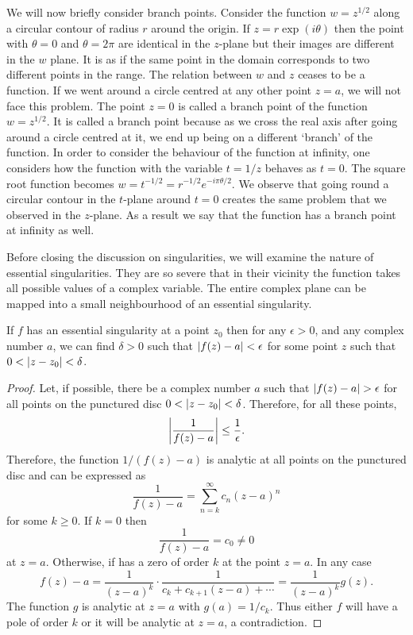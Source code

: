 We will now briefly consider branch points. Consider the function $w = z^{1/2}$
along a circular contour of radius $r$ around the origin. If $z=r\exp(i\theta)$
then the point with $\theta = 0$ and $\theta = 2\pi$ are identical in the 
$z$-plane but their images are different in the $w$ plane. It is as if the same
point in the domain corresponds to two different points in the range. The 
relation between $w$ and $z$ ceases to be a function. If we went around a circle
centred at any other point $z = a$, we will not face this problem. The point $z
= 0$ is called a branch point of the function $w = z^{1/2}$. It is called a 
branch point because as we cross the real axis after going around a circle
centred at it, we end up being on a different `branch' of the function. In order
to consider the behaviour of the function at infinity, one considers
how the function with the variable $t = 1/z$ behaves as $t = 0$. The square
root function becomes $w=t^{-1/2}=r^{-1/2}e^{-i\pi\theta/2}$. We observe that
going round a circular contour in the $t$-plane around $t = 0$ creates the same
problem that we observed in the $z$-plane. As a result we say that the function
has a branch point at infinity as well.

Before closing the discussion on singularities, we will examine the nature of 
essential singularities. They are so severe that in their vicinity the function
takes all possible values of a complex variable. The entire complex plane can be
mapped into a small neighbourhood of an essential singularity.


\begin{thm}\label{c5s2t2}
If $f$ has an essential singularity at a point $z_0$ then for any $\epsilon > 0$,
and any complex number $a$, we can find $\delta > 0$ such that $\left\vert{f(z) - a}\right\vert <
\epsilon$ for some point $z$ such that $0 < \left\vert{z - z_0}\right\vert < \delta$.
\end{thm}
\begin{proof}
Let, if possible, there be a complex number $a$ such that $\left\vert{f(z) - a}\right\vert > 
\epsilon$ for all points on the punctured disc $0 < \left\vert{z - z_0}\right\vert < \delta$.
Therefore, for all these points,
\[
\left\vert{\frac{1}{f(z) - a}}\right\vert \le \frac{1}{\epsilon}.
\]
Therefore, the function $1/(f(z) - a)$ is analytic at all points on the 
punctured disc and can be expressed as
\[
\frac{1}{f(z) - a} = \sum_{n = k}^\infty c_n(z - a)^n 
\]
for some $k \ge 0$. If $k = 0$ then
\[
\frac{1}{f(z) - a} = c_0 \ne 0
\] 
at $z = a$. Otherwise, if has a zero of order $k$ at the point $z=a$. In any 
case
\[
f(z) - a = \frac{1}{(z - a)^k}\cdot\frac{1}{c_k + c_{k+1}(z-a) + \cdots} = 
\frac{1}{(z - a)^k}g(z).
\]
The function $g$ is analytic at $z = a$ with $g(a) = 1/c_k$. Thus either $f$
will have a pole of order $k$ or it will be analytic at $z = a$, a contradiction.
\end{proof}

